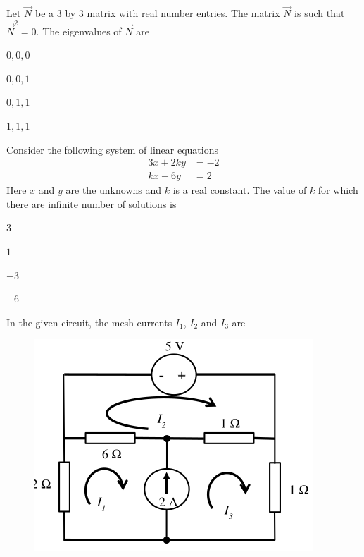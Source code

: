     \item Let $\vec{N}$ be a $3$ by $3$ matrix with real number entries. The matrix $\vec{N}$ is such that $\vec{N}^{2}=0$. The eigenvalues of $\vec{N}$ are
    \hfill{}
    \begin{enumerate}
        \begin{multicols}{4}
            \item $0,0,0$
            \item $0,0,1$
            \item $0,1,1$
            \item $1,1,1$
        \end{multicols}
    \end{enumerate}
    \item Consider the following system of linear equations
    \begin{align*}
    3x+2ky&=-2\\
    kx+6y&=2
    \end{align*}
    Here $x$ and $y$ are the unknowns and $k$ is a real constant. The value of $k$ for which there are infinite number of solutions is
    \hfill{}
    \begin{enumerate}
        \begin{multicols}{4}
            \item $3$
            \item $1$
            \item $-3$
            \item $-6$
        \end{multicols}
    \end{enumerate}
    \item In the given circuit, the mesh currents $I_{1}$, $I_{2}$ and $I_{3}$ are
    \begin{figure}[H]
        \centering
        \includegraphics[width=0.7\columnwidth]{GATE/2018/IN/figs/q32.png}
        \caption{}
        \label{fig:q32}
    \end{figure}
